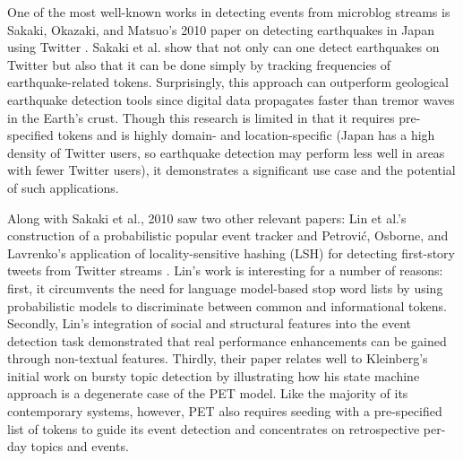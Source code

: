 \documentclass[letterpaper]{article}
\begin{document}
One of the most well-known works in detecting events from microblog streams is Sakaki, Okazaki, and Matsuo's 2010 paper on detecting earthquakes in Japan using Twitter \cite{Sakaki:2010:EST:1772690.1772777}.
Sakaki et al. show that not only can one detect earthquakes on Twitter but also that it can be done simply by tracking frequencies of earthquake-related tokens.
Surprisingly, this approach can outperform geological earthquake detection tools since digital data propagates faster than tremor waves in the Earth's crust.
Though this research is limited in that it requires pre-specified tokens and is highly domain- and location-specific (Japan has a high density of Twitter users, so earthquake detection may perform less well in areas with fewer Twitter users), it demonstrates a significant use case and the potential of such applications.

Along with Sakaki et al., 2010 saw two other relevant papers: Lin et al.'s construction of a probabilistic popular event tracker \cite{Lin:2010:PSM:1835804.1835922} and Petrovi\'{c}, Osborne, and Lavrenko's application of locality-sensitive hashing (LSH) for detecting first-story tweets from Twitter streams \cite{Petrovic:2010:SFS:1857999.1858020}.
Lin's work is interesting for a number of reasons: first, it circumvents the need for language model-based stop word lists by using probabilistic models to discriminate between common and informational tokens.
Secondly, Lin's integration of social and structural features into the event detection task demonstrated that real performance enhancements can be gained through non-textual features.
Thirdly, their paper relates well to Kleinberg's initial work on bursty topic detection by illustrating how his state machine approach is a degenerate case of the PET model.
Like the majority of its contemporary systems, however, PET also requires seeding with a pre-specified list of tokens to guide its event detection and concentrates on retrospective per-day topics and events.
\end{document}
